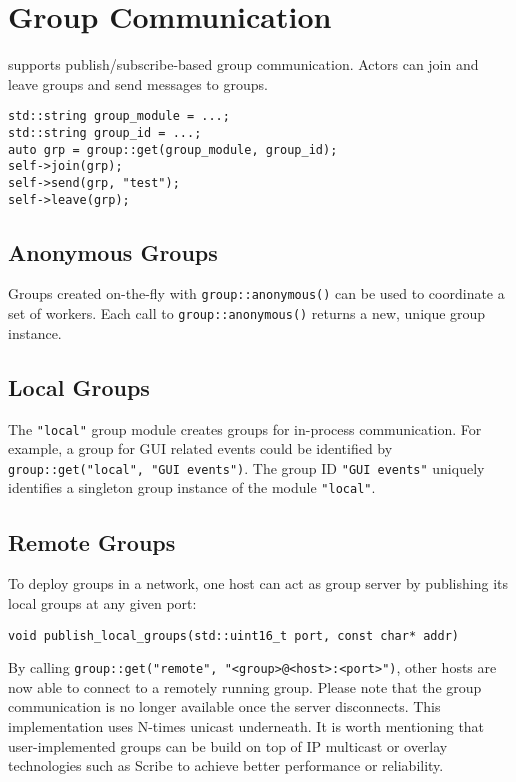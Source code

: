 \section{Group Communication}
\label{groups}

\lib supports publish/subscribe-based group communication.
Actors can join and leave groups and send messages to groups.

\begin{lstlisting}
std::string group_module = ...;
std::string group_id = ...;
auto grp = group::get(group_module, group_id);
self->join(grp);
self->send(grp, "test");
self->leave(grp);
\end{lstlisting}

\subsection{Anonymous Groups}

Groups created on-the-fly with \lstinline^group::anonymous()^ can be used to coordinate a set of workers.
Each call to \lstinline^group::anonymous()^ returns a new, unique group instance.

\subsection{Local Groups}

The \lstinline^"local"^ group module creates groups for in-process communication.
For example, a group for GUI related events could be identified by \lstinline^group::get("local", "GUI events")^.
The group ID \lstinline^"GUI events"^ uniquely identifies a singleton group instance of the module \lstinline^"local"^.

\subsection{Remote Groups}

To deploy groups in a network, one host can act as group server by publishing its local groups at any given port:

\begin{lstlisting}
void publish_local_groups(std::uint16_t port, const char* addr)
\end{lstlisting}

By calling \lstinline^group::get("remote", "<group>@<host>:<port>")^, other hosts are now able to connect to a remotely running group.
Please note that the group communication is no longer available once the server disconnects.
This implementation uses N-times unicast underneath.
It is worth mentioning that user-implemented groups can be build on top of IP multicast or overlay technologies such as Scribe to achieve better performance or reliability.

